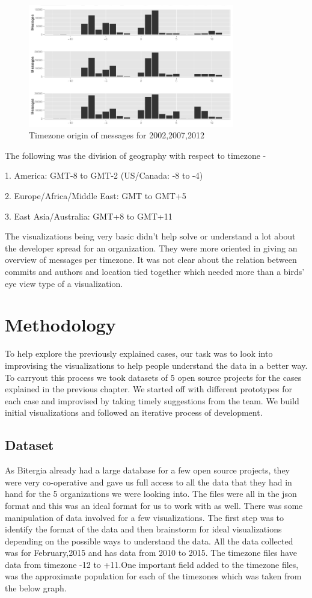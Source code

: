 \documentclass[seploa]{beavtex}
\begin{document}
\begin{figure}[!ht]
\centering
\includegraphics[width=90mm]{work2.png}
\caption{Timezone origin of messages for 2002,2007,2012}
\end{figure}

The following was the division of geography with respect to timezone -

1. America: GMT-8 to GMT-2 (US/Canada: -8 to -4)

2. Europe/Africa/Middle East: GMT to GMT+5

3. East Asia/Australia: GMT+8 to GMT+11


The visualizations being very basic didn't help solve or understand a lot about the developer spread for an organization. They were more oriented in giving an overview of messages per timezone. It was not clear about the relation between commits and authors and location tied together which needed more than a birds' eye view type of a visualization. 


\chapter{Methodology}
To help explore the previously explained cases, our task was to look into improvising the visualizations to help people understand the data in a better way. To carryout this process we took datasets of 5 open source projects for the cases explained in the previous chapter. We started off with different prototypes for each case and improvised by taking timely suggestions from the team. We build initial visualizations and followed an iterative process of development.

\section{Dataset}
As Bitergia already had a large database for a few open source projects, they were very co-operative and gave us full access to all the data that they had in hand for the 5 organizations we were looking into. The files were all in the json format and this was an ideal format for us to work with as well. There was some manipulation of data involved for a few visualizations. The first step was to identify the format of the data and then brainstorm for ideal visualizations depending on the possible ways to understand the data. All the data collected was for February,2015 and has data from 2010 to 2015. The timezone files have data from timezone -12 to +11.One important field added to the timezone files, was the approximate population for each of the timezones which was taken from the below graph.
\end{document}

